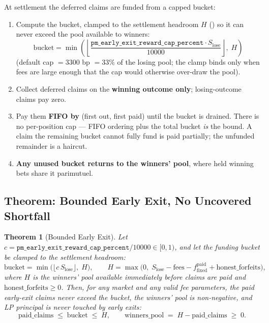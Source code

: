 \documentclass{ledger}
\theoremstyle{plain}
\newtheorem{theorem}{Theorem}
\theoremstyle{remark}
\begin{document}
At settlement the deferred claims are funded from a capped bucket:

\begin{enumerate}
  \item Compute the bucket, clamped to the settlement headroom $H$
  () so it can never exceed the pool available to winners:
  \[
  \text{bucket} = \min\!\left(\left\lfloor
  \frac{\texttt{pm\_early\_exit\_reward\_cap\_percent} \cdot S_{\text{lose}}}{10000}
  \right\rfloor,\; H\right)
  \]
  (default cap $=3300$ bp $=33\%$ of the losing pool; the clamp binds only when
  fees are large enough that the cap would otherwise over-draw the pool).
  \item Collect deferred claims on the \textbf{winning outcome only};
  losing-outcome claims pay zero.
  \item Pay them \textbf{FIFO by } (first out, first paid) until
  the bucket is drained. There is no per-position cap --- FIFO ordering plus the
  total bucket \emph{is} the bound. A claim the remaining bucket cannot fully
  fund is paid partially; the unfunded remainder is a haircut.
  \item \textbf{Any unused bucket returns to the winners' pool}, where held
  winning bets share it parimutuel.
\end{enumerate}

\subsection{Theorem: Bounded Early Exit, No Uncovered Shortfall}\label{sec:defthm}

\begin{theorem}[Bounded Early Exit]\label{thm:earlyexit}
Let $c = \texttt{pm\_early\_exit\_reward\_cap\_percent}/10000 \in [0,1)$, and let
the funding bucket be clamped to the settlement headroom:
\[
\text{bucket} = \min\!\big(\lfloor c\, S_{\text{lose}}\rfloor,\; H\big), \qquad
H = \max\!\big(0,\; S_{\text{lose}} - \text{fees} - f_{\text{fixed}}^{\text{paid}}
+ \text{honest\_forfeits}\big),
\]
where $H$ is the winners' pool available immediately \emph{before} claims are paid
and $\text{honest\_forfeits} \ge 0$. Then, for \emph{any} market and \emph{any}
valid fee parameters, the paid early-exit claims never exceed the bucket, the
winners' pool is non-negative, and LP principal is never touched by early exits:
\[
\text{paid\_claims} \;\le\; \text{bucket} \;\le\; H, \qquad
\text{winners\_pool} \;=\; H - \text{paid\_claims} \;\ge\; 0.
\]
\end{theorem}
\end{document}
